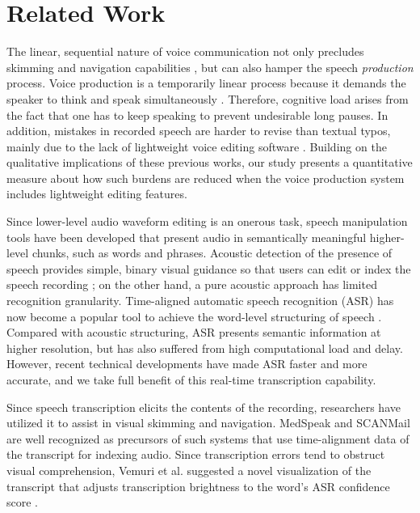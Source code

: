\section{Related Work}

The linear, sequential nature of voice communication not only precludes skimming and navigation capabilities \cite{grudin}, but can also hamper the speech \emph{production} process. 
Voice production is a temporarily linear process because it demands the speaker to think and speak simultaneously \cite{marriott2002, yoon:2015}.
Therefore, cognitive load arises from the fact that one has to keep speaking to prevent undesirable long pauses. 
In addition, mistakes in recorded speech are harder to revise than textual typos, mainly due to the lack of lightweight voice editing software \cite{marriott2002}.  
Building on the qualitative implications of these previous works, our study presents a quantitative measure about how such burdens are reduced when the voice production system includes lightweight editing features.

Since lower-level audio waveform editing is an onerous task, speech manipulation tools have been developed that present audio in semantically meaningful higher-level chunks, such as words and phrases.
Acoustic detection of the presence of speech provides simple, binary visual guidance so that users can edit or index the speech recording \cite{ades1986, hindus:1992}; on the other hand, a pure acoustic approach has limited recognition granularity. 
Time-aligned automatic speech recognition (ASR) has now become a popular tool to achieve the word-level structuring of speech \cite{Schmandt81, Wilcox:1992}. 
Compared with acoustic structuring, ASR presents semantic information at higher resolution, but has also suffered from high computational load and delay. 
However, recent technical developments have made ASR faster and more accurate, and we take full benefit of this real-time transcription capability.

Since speech transcription elicits the contents of the recording, researchers have utilized it to assist in visual skimming and navigation. 
MedSpeak \cite{Lai:1997} and SCANMail \cite{whittaker} are well recognized as precursors of such systems that use time-alignment data of the transcript for indexing audio. 
Since transcription errors tend to obstruct visual comprehension, Vemuri et al. suggested a novel visualization of the transcript that adjusts transcription brightness to the word's ASR confidence score \cite{Vemuri:2004}. 


